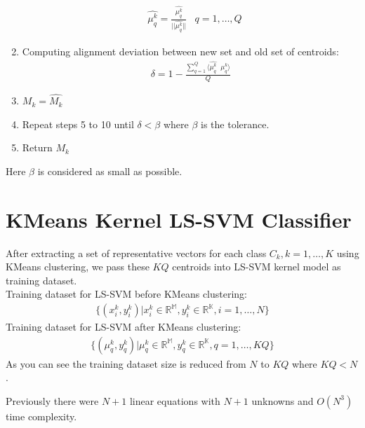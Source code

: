 \documentclass[conference]{IEEEtran}
\begin{document}
\begin{enumerate}
        \begin{align*}
            & \hat{\mu_{q}^{k}} = \frac{\hat{\mu_{q}^{k}}}{|| \hat{\mu_{q}^{k}} ||}
            & q=1,\ldots,Q
        \end{align*}
        \item Computing alignment deviation between new set and old set of centroids:
        \begin{align*}
            \delta = 1 - \frac{\sum_{q=1}^{Q}\langle \hat{\mu_{q}^{k}}\; \; \mu_{q}^{k} \rangle}{Q}
        \end{align*}
        \item $M_{k} = \hat{M_{k}}$
        \item Repeat steps 5 to 10 until $\delta < \beta $ where $\beta$ is the tolerance.
        \item Return $M_{k}$
    \end{enumerate}

    Here $\beta$ is considered as small as possible.


    \section{KMeans Kernel LS-SVM Classifier}\label{sec:kmeans-kernel-ls-svm-classifier}
    After extracting a set of representative vectors for each class
    $C_{k}, k=1,\ldots,K$ using KMeans clustering,
    we pass these $KQ$ centroids into LS-SVM kernel model as training dataset. \\
    Training dataset for LS-SVM before KMeans clustering:
    \begin{align*}
        \{(x_{i}^{k},y_{i}^{k})| x_{i}^{k} \in \mathbb{R^{M}},y_{i}^{k} \in \mathbb{R^{K}}, i=1,\ldots,N\}
    \end{align*}
    Training dataset for LS-SVM after KMeans clustering:
    \begin{align*}
        \{(\mu_{q}^{k},y_{q}^{k})| \mu_{q}^{k} \in \mathbb{R^{M}},y_{q}^{k} \in \mathbb{R^{K}}, q=1,\ldots,KQ\}
    \end{align*}
    As you can see the training dataset size is reduced from $N$ to $KQ$ where $KQ<N$.

    Previously there were $N+1$ linear equations with $N+1$ unknowns and $O(N^3)$ time complexity.
\end{document}
